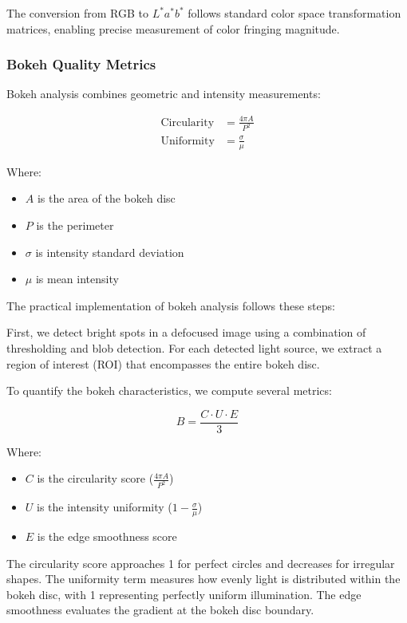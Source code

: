 The conversion from RGB to \( L^*a^*b^* \) follows standard color space transformation matrices, enabling precise measurement of color fringing magnitude.

\subsubsection{Bokeh Quality Metrics}
Bokeh analysis combines geometric and intensity measurements:

\begin{align}
\text{Circularity} &= \frac{4\pi A}{P^2} \\
\text{Uniformity} &= \frac{\sigma}{\mu}
\end{align}

Where:
\begin{itemize}
    \item \( A \) is the area of the bokeh disc
    \item \( P \) is the perimeter
    \item \( \sigma \) is intensity standard deviation
    \item \( \mu \) is mean intensity
\end{itemize}


The practical implementation of bokeh analysis follows these steps:

First, we detect bright spots in a defocused image using a combination of thresholding and blob detection. For each detected light source, we extract a region of interest (ROI) that encompasses the entire bokeh disc.

To quantify the bokeh characteristics, we compute several metrics:

\begin{equation}
B = \frac{C \cdot U \cdot E}{3}
\end{equation}

Where:
\begin{itemize}
    \item \( C \) is the circularity score (\( \frac{4\pi A}{P^2} \))
    \item \( U \) is the intensity uniformity (\( 1 - \frac{\sigma}{\mu} \))
    \item \( E \) is the edge smoothness score
\end{itemize}

The circularity score approaches 1 for perfect circles and decreases for irregular shapes. The uniformity term measures how evenly light is distributed within the bokeh disc, with 1 representing perfectly uniform illumination. The edge smoothness evaluates the gradient at the bokeh disc boundary.

